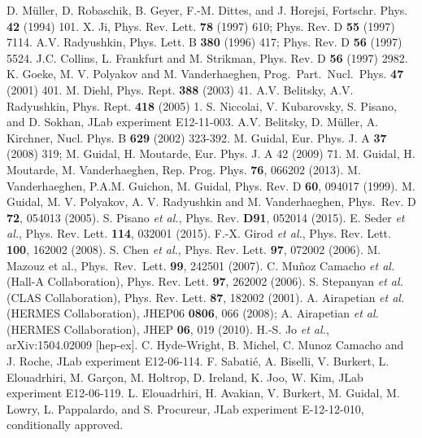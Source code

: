 \documentclass[12pt, letterpaper]{article}
\begin{document}
%

\newpage
\begin{thebibliography}{999}
D. M\"uller, D. Robaschik, B. Geyer, F.-M. Dittes, and J. Horejsi, Fortschr. Phys. {\bf 42} (1994) 101.
 X. Ji, Phys. Rev. Lett. {\bf 78} (1997) 610;
Phys. Rev. D {\bf 55} (1997) 7114.
 A.V. Radyushkin, Phys. Lett. B {\bf 380} (1996) 417; Phys. Rev. D {\bf 56} (1997) 5524.
 J.C. Collins, L. Frankfurt and M. Strikman, Phys. Rev. D {\bf 56} (1997) 2982.
 K. Goeke, M. V. Polyakov and M. Vanderhaeghen, Prog.\ Part.\ Nucl.\ Phys. {\bf 47} (2001) 401.
 M. Diehl, Phys.  Rept. {\bf 388} (2003) 41.
 A.V. Belitsky, A.V. Radyushkin, Phys. Rept. {\bf 418} (2005) 1.
 S. Niccolai, V. Kubarovsky, S. Pisano, and D. Sokhan, JLab experiment E12-11-003.
 A.V. Belitsky, D. M\"uller, A. Kirchner, Nucl. Phys. B {\bf 629} (2002) 323-392.
 M. Guidal, Eur. Phys. J. A {\bf 37} (2008) 319; M. Guidal, H. Moutarde, Eur. Phys. J. A 42 (2009) 71.
 M. Guidal, H. Moutarde, M. Vanderhaeghen, Rep. Prog. Phys. {\bf 76}, 066202 (2013).
 M. Vanderhaeghen, P.A.M. Guichon, M. Guidal, Phys. Rev. D {\bf 60}, 094017 (1999).
 M. Guidal, M. V. Polyakov, A. V. Radyushkin and 
M. Vanderhaeghen, Phys.\ Rev. D {\bf 72}, 054013 (2005).
 S. Pisano {\it et al.}, Phys. Rev. {\bf D91}, 052014 (2015).
 E. Seder {\it et al.}, Phys. Rev. Lett. {\bf 114}, 032001 (2015).
 F.-X. Girod {\it et al.}, Phys. Rev. Lett. {\bf 100}, 162002 (2008).
 S. Chen {\it et al.}, Phys. Rev. Lett. {\bf 97}, 072002 (2006).
 M. Mazouz et al., Phys.\ Rev.\ Lett. {\bf 99}, 242501 (2007).
 C. Mu\~noz Camacho {\it et al.} (Hall-A Collaboration), Phys. Rev. Lett. {\bf 97}, 262002 (2006).
 S. Stepanyan {\it et al.} (CLAS Collaboration), Phys. Rev. Lett. {\bf 87}, 182002 (2001).
 A. Airapetian {\it et al.} (HERMES Collaboration), JHEP06 {\bf 0806}, 066 (2008); A. Airapetian {\it et al.} (HERMES Collaboration), JHEP {\bf 06}, 019 (2010).
 H.-S. Jo {\it et al.}, arXiv:1504.02009 [hep-ex].
  C. Hyde-Wright, B. Michel, C. Munoz Camacho and J. Roche, JLab experiment E12-06-114.
 F. Sabati\'e, A. Biselli, V. Burkert, L. Elouadrhiri, M. Gar\c{c}on, M. Holtrop, D. Ireland, K. Joo, W. Kim, JLab experiment E12-06-119.
  L. Elouadrhiri, H. Avakian, V. Burkert, M. Guidal, M. Lowry, L. Pappalardo, and S. Procureur, JLab experiment E-12-12-010, conditionally approved.

\end{thebibliography}
\end{document}
